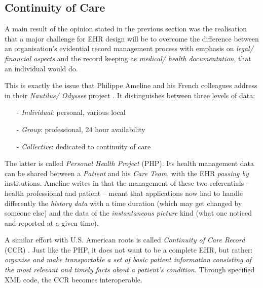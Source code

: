 %
%
%
%
%
%
%

\subsection{Continuity of Care}
\label{continuity_of_care_heading}

A main result of the opinion stated in the previous section was the realisation
that a major challenge for EHR design will be to overcome the difference
between an organisation's evidential record management process with emphasis on
\emph{legal/ financial aspects} and the record keeping as
\emph{medical/ health documentation}, that an individual would do.

This is exactly the issue that Philippe Ameline and his French colleagues
address in their \emph{Nautilus/ Odyssee} project \cite{nautilus}. It
distinguishes between three levels of data:

\begin{itemize}
    \item[-] \emph{Individual}: personal, various local
    \item[-] \emph{Group}: professional, 24 hour availability
    \item[-] \emph{Collective}: dedicated to continuity of care
\end{itemize}

The latter is called \emph{Personal Health Project} (PHP). Its health management
data can be shared between a \emph{Patient} and his \emph{Care Team}, with the
EHR \emph{passing by} institutions. Ameline writes in \cite{openehrtechnical}
that the management of these two referentials -- health professional and patient
-- meant that applications now had to handle differently the \emph{history data}
with a time duration (which may get changed by someone else) and the data of the
\emph{instantaneous picture} kind (what one noticed and reported at a given time).

A similar effort with U.S. American roots is called \emph{Continuity of Care Record}
(CCR) \cite{ccr}. Just like the PHP, it does not want to be a complete EHR, but
rather: \textit{organise and make transportable a set of basic patient
information consisting of the most relevant and timely facts about a patient's
condition.} Through specified XML code, the CCR becomes interoperable.
